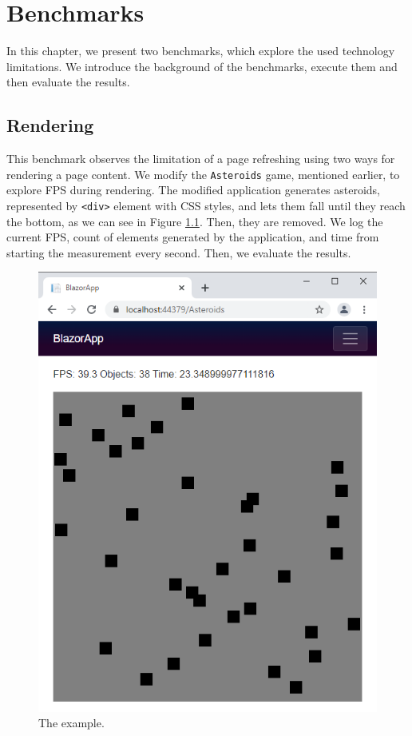 \chapter{Benchmarks}

In this chapter, we present two benchmarks, which explore the used technology limitations.
We introduce the background of the benchmarks, execute them and then evaluate the results.

\section{Rendering}

This benchmark observes the limitation of a page refreshing using two ways for rendering a page content.
We modify the \texttt{Asteroids} game, mentioned earlier, to explore FPS during rendering.
The modified application generates asteroids, represented by \texttt{<div>} element with CSS styles, and lets them fall until they reach the bottom, as we can see in Figure \ref{img33:benchmark}.
Then, they are removed.
We log the current FPS, count of elements generated by the application, and time from starting the measurement every second.
Then, we evaluate the results.
\par
\begin{figure}[b!]\centering
\includegraphics[scale=0.7]{./img/BenchmarkRendering}
\caption{The example.}
\label{img33:benchmark}
\end{figure} 
